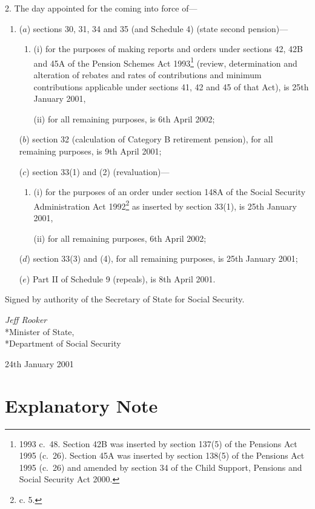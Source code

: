 \documentclass[12pt,a4paper]{article}
\begin{document}
2.  The day appointed for the coming into force of—
\begin{enumerate}\item[]
($a$) sections 30, 31, 34 and 35 (and Schedule 4) (state second pension)—
\begin{enumerate}\item[]
(i) for the purposes of making reports and orders under sections 42, 42B and 45A of the Pension Schemes Act 1993\footnote{1993 c.\ 48. Section 42B was inserted by section 137(5) of the Pensions Act 1995 (c.\ 26). Section 45A was inserted by section 138(5) of the Pensions Act 1995 (c.\ 26) and amended by section 34 of the Child Support, Pensions and Social Security Act 2000.} (review, determination and alteration of rebates and rates of contributions and minimum contributions applicable under sections 41, 42 and 45 of that Act), is 25th January 2001,

(ii) for all remaining purposes, is 6th April 2002;
\end{enumerate}

($b$) section 32 (calculation of Category B retirement pension), for all remaining purposes, is 9th April 2001;

($c$) section 33(1) and (2) (revaluation)—
\begin{enumerate}\item[]
(i) for the purposes of an order under section 148A of the Social Security Administration Act 1992\footnote{ c. 5.} as inserted by section 33(1), is 25th January 2001,

(ii) for all remaining purposes, 6th April 2002;
\end{enumerate}

($d$) section 33(3) and (4), for all remaining purposes, is 25th January 2001;

($e$) Part II of Schedule 9 (repeals), is 8th April 2001.
\end{enumerate}

\bigskip

Signed 
by authority of the Secretary of State for Social Security.

{\raggedleft
\emph{Jeff Rooker}\\*Minister of State,\\*Department of Social Security

}

24th January 2001

\small

\part{Explanatory Note}
\end{document}
